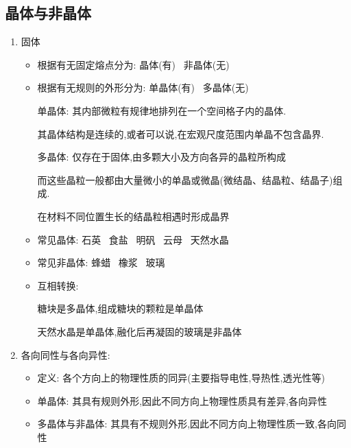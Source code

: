 \documentclass{article}
\begin{document}
\vspace{2em}

\subsection{晶体与非晶体}
\begin{enumerate}
    \item 固体
          \begin{itemize}
              \item 根据有无固定熔点分为: 晶体(有) \, 非晶体(无)
              \item 根据有无规则的外形分为: 单晶体(有) \, 多晶体(无)

                    \vspace{-1em}
                    \begin{adjustbox}{minipage=0.91\linewidth, bgcolor=gray!20, padding=1em}
                        \small %
                        单晶体: 其内部微粒有规律地排列在一个空间格子内的晶体.

                        \hspace{3.8em}其晶体结构是连续的,或者可以说,在宏观尺度范围内单晶不包含晶界.

                        多晶体: 仅存在于固体,由多颗大小及方向各异的晶粒所构成

                        \hspace{3.8em}而这些晶粒一般都由大量微小的单晶或微晶(微结晶、结晶粒、结晶子)组成.

                        \hspace{3.8em}在材料不同位置生长的结晶粒相遇时形成晶界
                    \end{adjustbox}
                    \vspace{-1em}

              \item 常见晶体: 石英 \, 食盐 \, 明矾 \, 云母 \, 天然水晶
              \item 常见非晶体: 蜂蜡 \, 橡浆 \, 玻璃
              \item 互相转换:

                    \hspace{4.8em}糖块是多晶体,组成糖块的颗粒是单晶体

                    \hspace{4.8em}天然水晶是单晶体,融化后再凝固的玻璃是非晶体
          \end{itemize}

    \item 各向同性与各向异性:
          \begin{itemize}
              \item 定义: 各个方向上的物理性质的同异(主要指导电性,导热性,透光性等)
              \item 单晶体: 其具有规则外形,因此不同方向上物理性质具有差异,各向异性
              \item 多晶体与非晶体: 其具有不规则外形,因此不同方向上物理性质一致,各向同性
          \end{itemize}


\end{enumerate}
\end{document}
